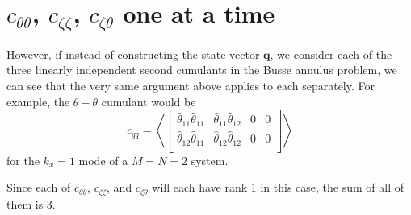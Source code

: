 \documentclass[11pt]{article}
\newcommand{\htt}{\hat{\theta}}
\newcommand{\czz}{c_{\zeta \zeta}}
\newcommand{\czt}{c_{\zeta \theta}}
\newcommand{\ctt}{c_{\theta \theta}}
\begin{document}
\section{$\ctt$, $\czz$, $\czt$ one at a time}
\label{sec:one_c}
However, if instead of constructing the state vector $\mathbf{q}$, we consider each of the three linearly independent second cumulants in the Busse annulus problem, we can see that the very same argument above applies to each separately.
For example, the $\theta-\theta$ cumulant would be
\begin{equation}
  \label{eq:one_example}
  c_{q q} = \left<
    \begin{bmatrix}
    \htt_{11} \htt_{11} & \htt_{11} \htt_{12} & 0 & 0 \\
    \htt_{12} \htt_{11} & \htt_{12} \htt_{12} & 0 & 0\\
  \end{bmatrix}
  \right>
\end{equation}
for the $k_x = 1$ mode of a $M = N = 2$ system.

Since each of $\ctt$, $\czz$, and $\czt$ will each have rank 1 in this case, the sum of all of them is 3.
\end{document}
